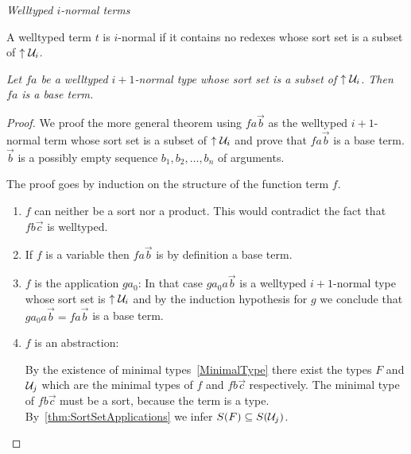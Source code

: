 \begin{definition}
    \label{def:INormalTerm}
    \emph{Welltyped $i$-normal terms}

    A welltyped term $t$ is $i$-normal if it contains no redexes whose sort set
    is a subset of ${\uparrow {\cal U}_i}$.
\end{definition}






\begin{theorem}
    \label{thm:NormalBaseTerm}
    \emph{Let $fa$ be a welltyped $i+1$-normal type whose sort set is a subset
    of ${{\uparrow {\cal U}_{i}}}$.  Then $fa$ is a base term.}

    \begin{proof}
        We proof the more general theorem using $f a \vec b$ as the welltyped
        $i+1$-normal term whose sort set is a subset of  ${{\uparrow {\cal U}_{i}}}$ and prove
        that $f a \vec b$ is a base term. $\vec b$ is a possibly empty sequence
        $b_1, b_2, \ldots, b_n$ of arguments.

        The proof goes by induction on the structure of the function term $f$.
        \begin{enumerate}

            \item $f$ can neither be a sort nor a product. This would contradict
                the fact that $f b \vec c$ is welltyped.

            \item If $f$ is a variable then $f a \vec b$ is by definition a base
                term.

            \item $f$ is the application $ga_0$: In that case $ga_0 a \vec b$ is
                a welltyped $i+1$-normal type whose sort set is ${{\uparrow {\cal U}_{i}}}$
                and by the induction hypothesis for $g$ we conclude that $g a_0
                a \vec b = f a \vec b$ is a base term.

            \item $f$ is an abstraction:

                By the existence of minimal types~\ref{MinimalType} there exist
                the types $F$ and ${\cal U}_j$ which are the minimal types of $f$
                and $f b \vec c$ respectively. The minimal type of $f b \vec c$
                must be a sort, because the term is a type.
                By~\ref{thm:SortSetApplications} we infer $S(F) \subseteq
                S({\cal U}_j)$.


\end{enumerate}
\end{proof}
\end{theorem}

